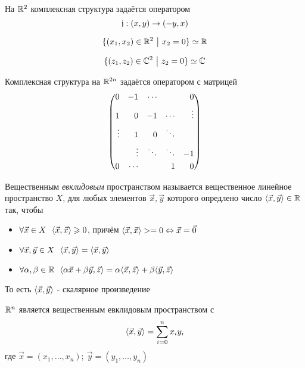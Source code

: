 \begin{example}
	На $\mathbb{R}^2$ комплексная структура задаётся оператором
	\[
		\mathfrak{j}: (x, y) \rightarrow (-y, x)
	\]
\end{example}

\begin{example}
	\[
		\{(x_1, x_2) \in \mathbb{R}^2 \ \big|\  x_2 = 0\} \simeq \mathbb{R}
	\]
\end{example}

\begin{example}
	\[
		\{(z_1, z_2) \in \mathbb{C}^2 \ \big|\  z_2 = 0\} \simeq \mathbb{C}
	\]
\end{example}

\begin{lemma}
	Комплексная структура на $\mathbb{R}^{2n}$ задаётся оператором с матрицей
	\[
		\left(\begin{aligned}
		0& & -1& & \cdots& & & & 0 \\
		1& & 0& & -1& & \cdots& & \vdots \\
		\vdots& & 1& & 0& & \ddots& & \\
		& & \vdots& & \ddots& & \ddots& & -1 \\
		0& & \cdots& & & & 1& & 0
		\end{aligned}\right)
	\]
\end{lemma}

\begin{definition}
	Вещественным \textit{евклидовым} пространством называется вещественное линейное пространство $X$, для любых элементов $\vec{x}, \vec{y}$ которого опредлено число $\langle\vec{x}, \vec{y}\rangle \in \mathbb{R}$ так, чтобы
	\begin{itemize}
		\item $\forall \vec{x} \in X\ \ \trbr{\vec{x}, \vec{x}} \ge 0$, причём $\langle\vec{x}, \vec{x}\rangle> = 0 \Leftrightarrow \vec{x} = \vec{0}$
		
		\item $\forall \vec{x}, \vec{y} \in X\ \ \trbr{\vec{x}, \vec{y}} = \trbr{\vec{x}, \vec{y}}$
		
		\item $\forall \alpha, \beta \in \R\ \ \trbr{\alpha\vec{x} + \beta\vec{y}, \vec{z}} = \alpha\trbr{\vec{x}, \vec{z}} + \beta\trbr{\vec{y}, \vec{z}}$
	\end{itemize}
	То есть $\langle\vec{x}, \vec{y}\rangle$ - скалярное произведение
\end{definition}

\begin{lemma}
	$\mathbb{R}^n$ является вещественным евклидовым пространством с
	\[
		\langle\vec{x}, \vec{y}\rangle = \sum\limits_{i = 0}^n x_iy_i
	\]
	где $\vec{x} = (x_1, \ldots, x_n);\ \vec{y} = (y_1, \ldots, y_n)$
\end{lemma}

